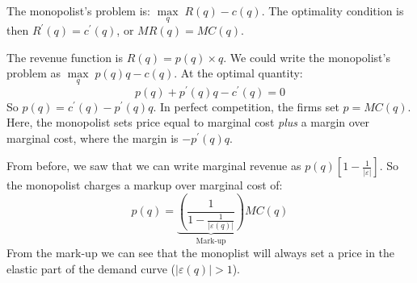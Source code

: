 \documentclass{article}
\begin{document}
The monopolist's problem is: $\underset{q}{\max}\; R\left( q \right)-c\left( q \right)$. The optimality condition is then $R^\prime\left( q \right)=c^\prime\left( q \right)$, or $MR\left( q \right)=MC\left( q \right)$.

The revenue function is $R\left( q \right)=p\left( q \right)\times q$. We could write the monopolist's problem as $\underset{q}{\max}\; p\left( q \right)q-c\left( q \right)$. At the optimal quantity:
\[
  p\left( q \right) + p^\prime\left( q \right)q - c^\prime\left( q \right)=0
\]
So $p\left( q \right)=c^\prime\left( q \right)-p^\prime\left( q \right)q$. In perfect competition, the firms set $p=MC\left( q \right)$. Here, the monopolist sets price equal to marginal cost \emph{plus} a margin over marginal cost, where the margin is $-p^\prime\left( q \right)q$.

From before, we saw that we can write marginal revenue as $p\left( q \right)\left[ 1-\frac{1}{\left| \varepsilon \right|} \right]$. So the monopolist charges a markup over marginal cost of:
\[p\left( q
    \right)=\underbrace{\left(\frac{1}{1-\frac{1}{\left| \varepsilon\left( q
  \right) \right|}}\right)}_{\text{Mark-up}} MC\left( q \right)
\]
From the mark-up we can see that the monoplist will always set a price in the elastic part of the demand curve ($\left| \varepsilon\left( q \right) \right|>1$).
\end{document}

